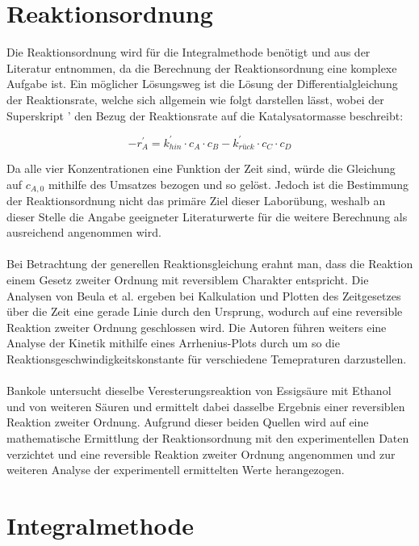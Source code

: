 \documentclass[12pt,liststotoc]{report}
\begin{document}
\section{Reaktionsordnung}


Die Reaktionsordnung wird für die Integralmethode benötigt und aus der Literatur entnommen, da die Berechnung der Reaktionsordnung eine komplexe Aufgabe ist. Ein möglicher Lösungsweg ist die Lösung der Differentialgleichung der Reaktionsrate, welche sich allgemein wie folgt darstellen lässt, wobei der Superskript ' den Bezug der Reaktionsrate auf die Katalysatormasse beschreibt:

\begin{equation}
\label{eq:rate-law}
    -r_{A}^{'} = k_{hin}^{'} \cdot c_{A} \cdot c_B - k_{rück}^{'} \cdot c_C \cdot c_D
\end{equation}
\noindent

Da alle vier Konzentrationen eine Funktion der Zeit sind, würde die Gleichung auf $c_{A,0}$ mithilfe des Umsatzes bezogen und so gelöst. Jedoch ist die Bestimmung der Reaktionsordnung nicht das primäre Ziel dieser Laborübung, weshalb an dieser Stelle die Angabe geeigneter Literaturwerte für die weitere Berechnung als ausreichend angenommen wird. 
\\
\\
Bei Betrachtung der generellen Reaktionsgleichung erahnt man, dass die Reaktion einem Gesetz zweiter Ordnung mit reversiblem Charakter entspricht. Die Analysen von Beula et al. \cite{beula2015kinetics}
ergeben bei Kalkulation und Plotten des Zeitgesetzes über die Zeit eine gerade Linie durch den Ursprung, wodurch auf eine reversible Reaktion zweiter Ordnung geschlossen wird. Die Autoren führen weiters eine Analyse der Kinetik mithilfe eines Arrhenius-Plots durch um so die Reaktionsgeschwindigkeitskonstante für verschiedene Temepraturen darzustellen.  
\\
\\
Bankole \cite{bankole2011uncatalyzed} untersucht dieselbe Veresterungsreaktion von Essigsäure mit Ethanol und von weiteren Säuren und ermittelt dabei dasselbe Ergebnis einer reversiblen Reaktion zweiter Ordnung. Aufgrund dieser beiden Quellen wird auf eine mathematische Ermittlung der Reaktionsordnung mit den experimentellen Daten verzichtet und eine reversible Reaktion zweiter Ordnung angenommen und zur weiteren Analyse der experimentell ermittelten Werte herangezogen.


\section{Integralmethode}
\label{sec:integral}
\end{document}

